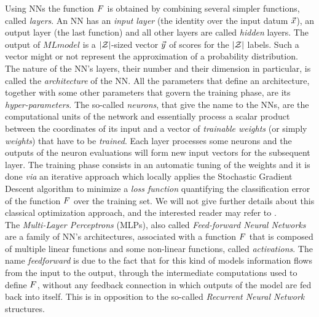 Using NNs the function $F$ is obtained by combining several simpler functions, called \emph{layers}. An NN has an \emph{input layer} (the identity over the input datum $\vec{x}$), an output layer (the last function) and all other layers are called \emph{hidden} layers.  The output of $MLmodel$ is a $\lvert\mathcal{Z}\rvert$-sized vector $\vec{y}$ of scores for the $\lvert\mathcal{Z}\rvert$ labels. Such a vector might or not represent the approximation of a probability distribution. The nature of the NN's  layers, their number and their dimension in particular, is called the \emph{architecture} of the NN. All the parameters that define an architecture, together with some other parameters that govern the training phase, are its \emph{hyper-parameters}. The so-called \emph{neurons}, that give the name to the NNs, are the computational units of the network and essentially process a scalar product between the coordinates of its input and a vector of  \emph{trainable weights} (or simply \emph{weights}) that have to be \emph{trained}. Each layer processes some neurons and the outputs of the neuron evaluations will form new input vectors for the subsequent layer. The training phase consists in an automatic tuning of the weights and it is done \emph{via} an iterative approach which locally applies the Stochastic Gradient Descent algorithm \cite{Goodfellow-et-al-2016} to minimize a  \emph{loss function} quantifying the classification error of the function $F$ over the training set. We will not give further details about this classical optimization approach, and the interested reader may refer to \cite{Goodfellow-et-al-2016}.\\

The {\em Multi-Layer Perceptrons} (MLPs), also called \emph{Feed-forward Neural Networks} are a family of NN's architectures, associated with a function $F$  that is composed of multiple linear functions and some non-linear functions, called {\em activations}. The name \emph{feedforward} is due to the fact that for this kind of models information ﬂows from  the input to the output, through the intermediate computations used to deﬁne $F$, without any feedback connection in which outputs of the model are fed back into itself. This is in opposition to the so-called \emph{Recurrent Neural Network} structures.\\

